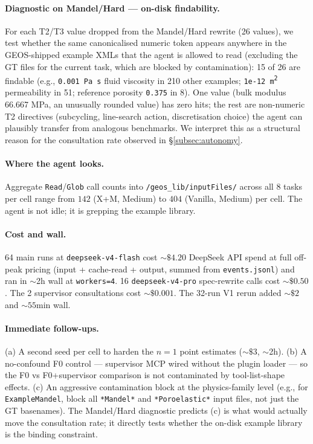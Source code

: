 \documentclass{article}
\begin{document}
\paragraph{Diagnostic on Mandel/Hard --- on-disk findability.} For each T2/T3 value dropped from the Mandel/Hard rewrite (26 values), we test whether the same canonicalised numeric token appears anywhere in the GEOS-shipped example XMLs that the agent is allowed to read (excluding the GT files for the current task, which are blocked by contamination): 15 of 26 are findable (e.g., \texttt{0.001 Pa\,s} fluid viscosity in 210 other examples; \texttt{1e-12 m\textsuperscript{2}} permeability in 51; reference porosity \texttt{0.375} in 8). One value (bulk modulus 66.667 MPa, an unusually rounded value) has zero hits; the rest are non-numeric T2 directives (subcycling, line-search action, discretisation choice) the agent can plausibly transfer from analogous benchmarks. We interpret this as a structural reason for the consultation rate observed in \S\ref{subsec:autonomy}.

\paragraph{Where the agent looks.} Aggregate \texttt{Read}/\texttt{Glob} call counts into \texttt{/geos\_lib/inputFiles/} across all 8 tasks per cell range from $142$ (X+M, Medium) to $404$ (Vanilla, Medium) per cell. The agent is not idle; it is grepping the example library.

\paragraph{Cost and wall.} 64 main runs at \texttt{deepseek-v4-flash} cost ${\sim}\$4.20$ DeepSeek API spend at full off-peak pricing (input + cache-read + output, summed from \texttt{events.jsonl}) and ran in $\sim$2h wall at \texttt{workers=4}. 16 \texttt{deepseek-v4-pro} spec-rewrite calls cost ${\sim}\$0.50$. The 2 supervisor consultations cost ${\sim}\$0.001$. The 32-run V1 rerun added ${\sim}\$2$ and ${\sim}55$min wall.

\paragraph{Immediate follow-ups.} (a) A second seed per cell to harden the $n=1$ point estimates ($\sim\$3$, $\sim$2h). (b) A no-confound F0 control --- supervisor MCP wired without the plugin loader --- so the F0 vs F0+supervisor comparison is not contaminated by tool-list-shape effects. (c) An aggressive contamination block at the physics-family level (e.g., for \texttt{ExampleMandel}, block all \texttt{*Mandel*} and \texttt{*Poroelastic*} input files, not just the GT basenames). The Mandel/Hard diagnostic predicts (c) is what would actually move the consultation rate; it directly tests whether the on-disk example library is the binding constraint.
\end{document}
